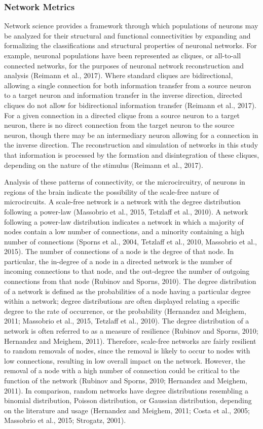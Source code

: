 \documentclass[11pt,titlepage]{article}
\begin{document}
\subsubsection{Network Metrics}\label{sssec:NM}
Network science provides a framework through which populations of neurons may be analyzed for their structural and functional connectivities by expanding and formalizing the classifications and structural properties of neuronal networks. For example, neuronal populations have been represented as cliques, or all-to-all connected networks, for the purposes of neuronal network reconstruction and analysis (Reimann et al., 2017). Where standard cliques are bidirectional, allowing a single connection for both information transfer from a source neuron to a target neuron and information transfer in the inverse direction, directed cliques do not allow for bidirectional information transfer (Reimann et al., 2017). For a given connection in a directed clique from a source neuron to a target neuron, there is no direct connection from the target neuron to the source neuron, though there may be an intermediary neuron allowing for a connection in the inverse direction. The reconstruction and simulation of networks in this study that information is processed by the formation and disintegration of these cliques, depending on the nature of the stimulus (Reimann et al., 2017).\par
Analysis of these patterns of connectivity, or the microcircuitry, of neurons in regions of the brain indicate the possibility of the scale-free nature of microcircuits. A scale-free network is a network with the degree distribution following a power-law (Massobrio et al., 2015, Tetzlaff et al., 2010). A network following a power-law distribution indicates a network in which a majority of nodes contain a low number of connections, and a minority containing a high number of connections (Sporns et al., 2004, Tetzlaff et al., 2010, Massobrio et al., 2015). The number of connections of a node is the degree of that node. In particular, the in-degree of a node in a directed network is the number of incoming connections to that node, and the out-degree the number of outgoing connections from that node (Rubinov and Sporns, 2010). The degree distribution of a network is defined as the probabilities of a node having a particular degree within a network; degree distributions are often displayed relating a specific degree to the rate of occurrence, or the probability (Hernandez and Meighem, 2011; Massobrio et al., 2015, Tetzlaff et al., 2010). The degree distribution of a network is often referred to as a measure of resilience (Rubinov and Sporns, 2010; Hernandez and Meighem, 2011). Therefore, scale-free networks are fairly resilient to random removals of nodes, since the removal is likely to occur to nodes with low connections, resulting in low overall impact on the network. However, the removal of a node with a high number of connection could be critical to the function of the network (Rubinov and Sporns, 2010; Hernandez and Meighem, 2011). In comparison, random networks have degree distributions resembling a binomial distribution, Poisson distribution, or Gaussian distribution, depending on the literature and usage (Hernandez and Meighem, 2011; Costa et al., 2005; Massobrio et al., 2015; Strogatz, 2001).
\end{document}
